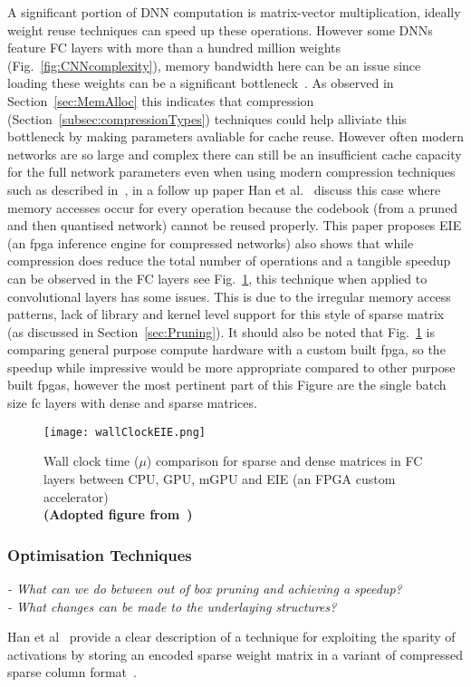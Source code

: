 \documentclass[../../D1.tex]{subfiles}
\begin{document}
A significant portion of DNN computation is matrix-vector multiplication, ideally weight reuse techniques can speed up these operations.
However some DNNs feature FC layers with more than a hundred million weights (Fig.~\ref{fig:CNNcomplexity}), memory bandwidth here can be an issue since loading these weights can be a significant bottleneck~\autocite{qiuGoingDeeperEmbedded2016}. 
As observed in Section~\ref{sec:MemAlloc} this indicates that compression (Section~\ref{subsec:compressionTypes}) techniques could help alliviate this bottleneck by making parameters avaliable for cache reuse.
However often modern networks are so large and complex there can still be an insufficient cache capacity for the full network parameters even when using modern compression techniques such as described in~\autocite{hanDeepCompressionCompressing2016}, in a follow up paper Han et al.~\autocite{hanEIEEfficientInference2016} discuss this case where memory accesses occur for every operation because the codebook (from a pruned and then quantised network) cannot be reused properly.
This paper proposes EIE (an \acrshort{fpga} inference engine for compressed networks) also shows that while compression does reduce the total number of operations and a tangible speedup can be observed in the FC layers see Fig.~\ref{fig:wallClockEIE}, this technique when applied to convolutional layers has some issues.
This is due to the irregular memory access patterns, lack of library and kernel level support for this style of sparse matrix (as discussed in Section~\ref{sec:Pruning}). 
It should also be noted that Fig.~\ref{fig:wallClockEIE} is comparing general purpose compute hardware with a custom built \acrshort{fpga}, so the speedup while impressive would be more appropriate compared to other purpose built \acrshort{fpga}s, however the most pertinent part of this Figure are the single batch size \acrshort{fc} layers with dense and sparse matrices.



\begin{figure}[H]
    \texttt{[image: wallClockEIE.png]} 
    \caption{Wall clock time ($\mu$) comparison for sparse and dense matrices in FC layers between CPU, GPU, mGPU and EIE (an FPGA custom accelerator)\\ \textbf{(Adopted figure from~\autocite{hanEIEEfficientInference2016})}}
    \label{fig:wallClockEIE}   
\end{figure}

\subsubsection{Optimisation Techniques}
\emph{
- What can we do between out of box pruning and achieving a speedup?\\
- What changes can be made to the underlaying structures?
}


 Han et al~\autocite{hanEIEEfficientInference2016} provide a clear description of a technique for exploiting the sparity of activations by storing an encoded sparse weight matrix in a variant of compressed sparse column format~\autocite{vuducAutomaticPerformanceTuning}.
\end{document}

